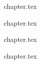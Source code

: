 \documentclass[11pt,a4paper]{report}
\newcommand{\stitchchapter}[2]{%
  \clearpage
  \graphicspath{{chapters/#1/}{chapters/#1/figures/}{chapters/#1/pictures/}}%
  \begingroup
  {#2}%
  \endgroup
  \FloatBarrier
}
\begin{document}
\stitchchapter{ch07}{chapter.tex}

\stitchchapter{ch08}{chapter.tex}

\stitchchapter{ch09}{chapter.tex}

\stitchchapter{ch10}{chapter.tex}





\clearpage
{}
{}
\begingroup
\small


\endgroup
\end{document}
